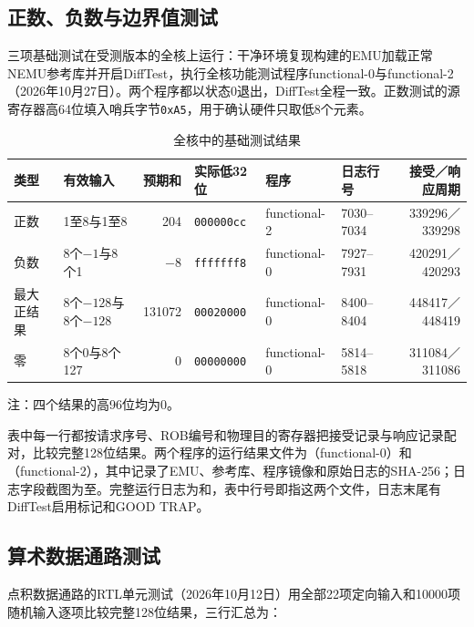 \subsection{正数、负数与边界值测试}\label{sec:s2-basic}

三项基础测试在受测版本的全核上运行：干净环境复现构建的EMU加载正常NEMU参考库并开启DiffTest，执行全核功能测试程序functional-0与functional-2（2026年10月27日）。两个程序都以状态0退出，DiffTest全程一致。正数测试的源寄存器高64位填入哨兵字节\texttt{0xA5}，用于确认硬件只取低8个元素。

\begin{table}[!htbp]\centering\small
\caption{全核中的基础测试结果}\label{tab:basic}
\setlength{\tabcolsep}{4pt}
\begin{tabular}{llrlllr}
\toprule
类型 & 有效输入 & 预期和 & 实际低32位 & 程序 & 日志行号 & 接受／响应周期\\
\midrule
正数 & 1至8与1至8 & 204 & \texttt{000000cc} & functional-2 & 7030--7034 & 339296／339298\\
负数 & 8个$-1$与8个1 & $-8$ & \texttt{fffffff8} & functional-0 & 7927--7931 & 420291／420293\\
最大正结果 & 8个$-128$与8个$-128$ & 131072 & \texttt{00020000} & functional-0 & 8400--8404 & 448417／448419\\
零 & 8个0与8个127 & 0 & \texttt{00000000} & functional-0 & 5814--5818 & 311084／311086\\
\bottomrule
\end{tabular}
\par\smallskip
{\footnotesize 注：四个结果的高96位均为0。}
\end{table}

表中每一行都按请求序号、ROB编号和物理目的寄存器把接受记录与响应记录配对，比较完整128位结果。两个程序的运行结果文件为（functional-0）和（functional-2），其中记录了EMU、参考库、程序镜像和原始日志的SHA-256；日志字段截图为至。完整运行日志为和，表中行号即指这两个文件，日志末尾有DiffTest启用标记和GOOD TRAP。

\subsection{算术数据通路测试}\label{sec:s2-arith}

点积数据通路的RTL单元测试（2026年10月12日）用全部22项定向输入和10000项随机输入逐项比较完整128位结果，三行汇总为：

